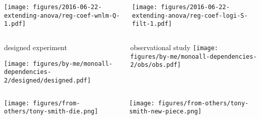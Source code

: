 \documentclass{beamer}
\newcommand{\platefigscale}[0]{0.7}
\begin{document}
\begin{frame}[plain]
\begin{columns}[t]
\begin{column}{0.5\textwidth}

\texttt{[image: figures/2016-06-22-extending-anova/reg-coef-wnlm-Q-1.pdf]}
\end{column}

\begin{column}{0.5\textwidth}

\texttt{[image: figures/2016-06-22-extending-anova/reg-coef-logi-S-filt-1.pdf]}
\end{column}
\end{columns}
\end{frame}




\begin{frame}[t, plain]
\begin{columns}[t]
\begin{column}{0.5\textwidth}
designed experiment

\texttt{[image: figures/by-me/monoall-dependencies-2/designed/designed.pdf]}

\end{column}

\begin{column}{0.5\textwidth}
observational study
\texttt{[image: figures/by-me/monoall-dependencies-2/obs/obs.pdf]}
\end{column}
\end{columns}
\vfill

\begin{columns}[t]
\begin{column}{0.5\textwidth}

\texttt{[image: figures/from-others/tony-smith-die.png]}
\end{column}

\begin{column}{0.5\textwidth}

\texttt{[image: figures/from-others/tony-smith-new-piece.png]}
\end{column}
\end{columns}
\end{frame}
\end{document}
